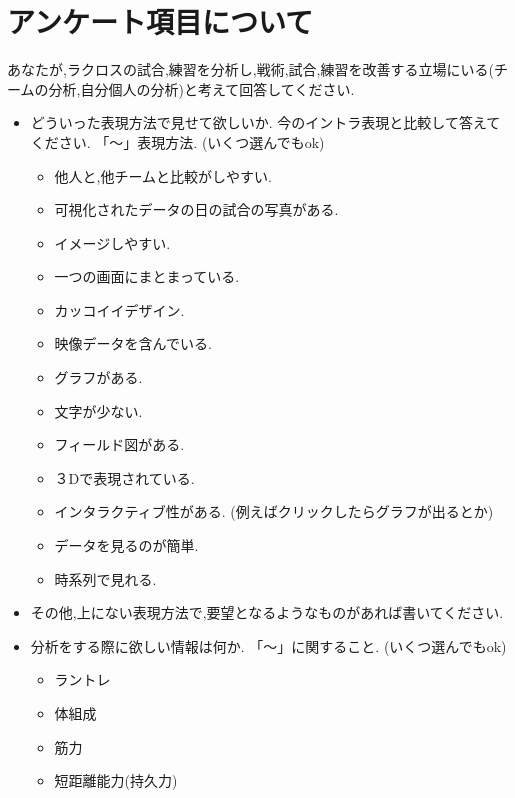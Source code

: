 \documentclass[sotsuron]{kuee}
\begin{document}





\appendix
\chapter{アンケート項目について}
	あなたが,ラクロスの試合,練習を分析し,戦術,試合,練習を改善する立場にいる(チームの分析,自分個人の分析)と考えて回答してください. 
	\begin{itemize}
		\item どういった表現方法で見せて欲しいか. 
			今のイントラ表現と比較して答えてください. 「〜」表現方法. (いくつ選んでもok)
			\begin{itemize}
				\item 他人と,他チームと比較がしやすい. 
				\item 可視化されたデータの日の試合の写真がある. 
				\item イメージしやすい. 
				\item 一つの画面にまとまっている. 
				\item カッコイイデザイン. 
				\item 映像データを含んでいる. 
				\item グラフがある. 
				\item 文字が少ない. 
				\item フィールド図がある. 
				\item ３Dで表現されている. 
				\item インタラクティブ性がある. (例えばクリックしたらグラフが出るとか)
				\item データを見るのが簡単. 
				\item 時系列で見れる. 
			\end{itemize}
		\item その他,上にない表現方法で,要望となるようなものがあれば書いてください. 
		\item 分析をする際に欲しい情報は何か. 
			「〜」に関すること. (いくつ選んでもok)
			\begin{itemize}
				\item ラントレ
				\item 体組成
				\item 筋力
				\item 短距離能力(持久力)

\end{itemize}
\end{itemize}
\end{document}
